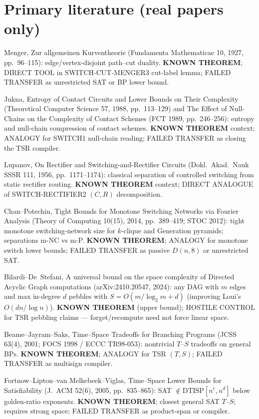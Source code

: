 \documentclass[11pt]{article}
\begin{document}
\section*{Primary literature (real papers only)}
Menger, Zur allgemeinen Kurventheorie (Fundamenta Mathematicae 10, 1927, pp.~96--115):
edge/vertex-disjoint path--cut duality. \textbf{KNOWN THEOREM}; DIRECT TOOL in SWITCH-CUT-MENGER3
cut-label lemma; FAILED TRANSFER as unrestricted SAT or BP lower bound.

Jukna, Entropy of Contact Circuits and Lower Bounds on Their Complexity
(Theoretical Computer Science 57, 1988, pp.~113--129) and The Effect of Null-Chains on the
Complexity of Contact Schemes (FCT 1989, pp.~246--256): entropy and null-chain compression
of contact schemes. \textbf{KNOWN THEOREM} context; ANALOGY for SWITCH1 null-chain reading;
FAILED TRANSFER as closing the TSR compiler.

Lupanov, On Rectifier and Switching-and-Rectifier Circuits
(Dokl.\ Akad.\ Nauk SSSR 111, 1956, pp.~1171--1174): classical separation of controlled
switching from static rectifier routing. \textbf{KNOWN THEOREM} context; DIRECT ANALOGUE of
SWITCH-RECTIFIER2 $(C,R)$ decomposition.

Chan--Potechin, Tight Bounds for Monotone Switching Networks via Fourier Analysis
(Theory of Computing 10(15), 2014, pp.~389--419; STOC 2012): tight monotone switching-network
size for $k$-clique and Generation pyramids; separations m-NC vs m-P. \textbf{KNOWN THEOREM};
ANALOGY for monotone switch lower bounds; FAILED TRANSFER as passive $D(n,8)$ or unrestricted SAT.

Bilardi--De~Stefani, A universal bound on the space complexity of Directed Acyclic Graph
computations (arXiv:2410.20547, 2024): any DAG with $m$ edges and max in-degree $d$ pebbles with
$S=O(m/\log_2 m+d)$ (improving Loui's $O(dn/\log n)$). \textbf{KNOWN THEOREM} (upper bound);
HOSTILE CONTROL for TSR pebbling claims --- forget/recompute need not force linear space.

Beame--Jayram--Saks, Time--Space Tradeoffs for Branching Programs (JCSS 63(4), 2001;
FOCS 1998 / ECCC TR98-053): nontrivial $T$--$S$ tradeoffs on general BPs.
\textbf{KNOWN THEOREM}; ANALOGY for TSR $(T,S)$; FAILED TRANSFER as multisign compiler.

Fortnow--Lipton--van Melkebeek--Viglas, Time--Space Lower Bounds for Satisfiability
(J.\ ACM 52(6), 2005, pp.~835--865): SAT $\notin\mathrm{DTISP}[n^c,n^d]$ below golden-ratio
exponents. \textbf{KNOWN THEOREM}; closest general SAT $T$--$S$; requires strong space;
FAILED TRANSFER as product-span or compiler.
\end{document}
